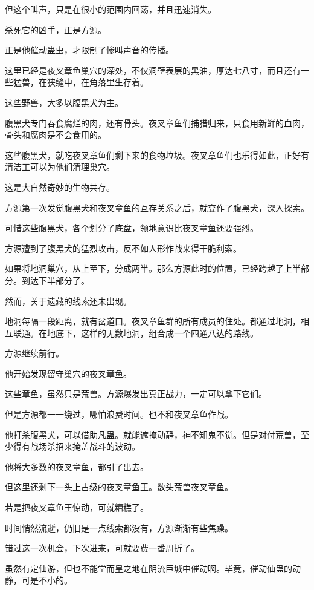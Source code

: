 \begin{this_body}
但这个叫声，只是在很小的范围内回荡，并且迅速消失。

杀死它的凶手，正是方源。

正是他催动蛊虫，才限制了惨叫声音的传播。

这里已经是夜叉章鱼巢穴的深处，不仅洞壁表层的黑油，厚达七八寸，而且还有一些猛兽，在狭缝中，在角落里生存着。

这些野兽，大多以腹黑犬为主。

腹黑犬专门吞食腐烂的肉，还有骨头。夜叉章鱼们捕猎归来，只食用新鲜的血肉，骨头和腐肉是不会食用的。

这些腹黑犬，就吃夜叉章鱼们剩下来的食物垃圾。夜叉章鱼们也乐得如此，正好有清洁工可以为他们清理巢穴。

这是大自然奇妙的生物共存。

方源第一次发觉腹黑犬和夜叉章鱼的互存关系之后，就变作了腹黑犬，深入探索。

可惜这些腹黑犬，各个划分了底盘，领地意识比夜叉章鱼还要强烈。

方源遭到了腹黑犬的猛烈攻击，反不如人形作战来得干脆利索。

如果将地洞巢穴，从上至下，分成两半。那么方源此时的位置，已经跨越了上半部分。到达下半部分了。

然而，关于遗藏的线索还未出现。

地洞每隔一段距离，就有岔道口。夜叉章鱼群的所有成员的住处。都通过地洞，相互联通。在地底下，这样的无数地洞，组合成一个四通八达的路线。

方源继续前行。

他开始发现留守巢穴的夜叉章鱼。

这些章鱼，虽然只是荒兽。方源爆发出真正战力，一定可以拿下它们。

但是方源都一一绕过，哪怕浪费时间。也不和夜叉章鱼作战。

他打杀腹黑犬，可以借助凡蛊。就能遮掩动静，神不知鬼不觉。但是对付荒兽，至少得有战场杀招来掩盖战斗的波动。

他将大多数的夜叉章鱼，都引了出去。

但这里还剩下一头上古级的夜叉章鱼王。数头荒兽夜叉章鱼。

若是把夜叉章鱼王惊动，可就糟糕了。

时间悄然流逝，仍旧是一点线索都没有，方源渐渐有些焦躁。

错过这一次机会，下次进来，可就要费一番周折了。

虽然有定仙游，但也不能堂而皇之地在阴流巨城中催动啊。毕竟，催动仙蛊的动静，可是不小的。


\end{this_body}
